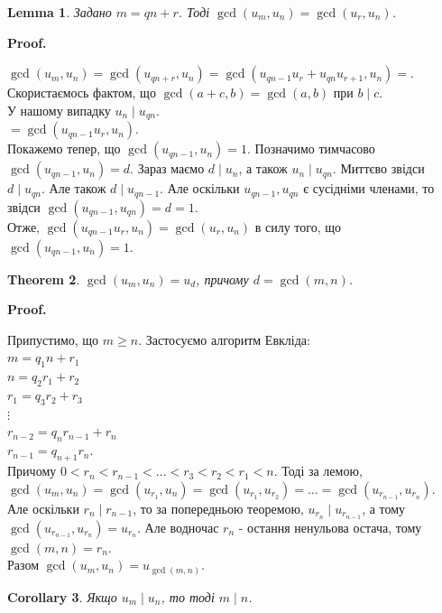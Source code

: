 \documentclass[a4paper, 10pt]{article}
\makeatletter
\theoremstyle{theoremdd}
\newtheorem{theorem}{Theorem}[subsection]
\theoremstyle{theoremdd}
\theoremstyle{theoremdd}
\theoremstyle{theoremdd}
\theoremstyle{theoremdd}
\theoremstyle{theoremdd}
\theoremstyle{theoremdd}
\newtheorem{lemma}[theorem]{Lemma}
\theoremstyle{theoremdd}
\newtheorem{corollary}[theorem]{Corollary}
\renewenvironment{proof}[1][Proof.\\]{\par
\pushQED{\hfill \qed}%
\normalfont \topsep6\p@\@plus6\p@\relax
\trivlist
\item\relax
{\bfseries
#1\@addpunct{.}}\hspace\labelsep\ignorespaces
}{%
\popQED\endtrivlist\@endpefalse
}
\makeatother
\begin{document}
\begin{lemma}
Задано $m = qn + r$. Тоді $\gcd(u_m,u_n) = \gcd(u_r,u_n)$.
\end{lemma}

\begin{proof}
$\gcd(u_m,u_n) = \gcd(u_{qn+r},u_n) = \gcd(u_{qn-1}u_r+u_{qn}u_{r+1},u_n) \boxed{=}$.\\
Скористаємось фактом, що $\gcd(a+c,b) = \gcd(a,b)$ при $b \mid c$.\\
У нашому випадку $u_n \mid u_{qn}$.\\
$\boxed{=} \gcd(u_{qn-1}u_r,u_n)$.\\
Покажемо тепер, що $\gcd(u_{qn-1},u_n) = 1$. Позначимо тимчасово $\gcd(u_{qn-1},u_n) = d$. Зараз маємо $d \mid u_n$, а також $u_n \mid u_{qn}$. Миттєво звідси $d \mid u_{qn}$. Але також $d \mid u_{qn-1}$. Але оскільки $u_{qn-1}, u_{qn}$ є сусідніми членами, то звідси $\gcd(u_{qn-1},u_{qn}) = d = 1$.\\
Отже, $\gcd(u_{qn-1}u_r,u_n) = \gcd(u_r,u_n)$ в силу того, що $\gcd(u_{qn-1},u_n) = 1$. 
\end{proof}

\begin{theorem}
$\gcd(u_m,u_n) = u_d$, причому $d = \gcd(m,n)$.
\end{theorem}

\begin{proof}
Припустимо, що $m \geq n$. Застосуємо алгоритм Евкліда:\\
$m = q_1n + r_1$\\
$n = q_2r_1 + r_2$\\
$r_1 = q_3r_2 + r_3$\\
$\vdots$\\
$r_{n-2} = q_nr_{n-1} +r_n$\\
$r_{n-1} = q_{n+1}r_n$.\\
Причому $0 < r_n < r_{n-1} < \dots < r_3 < r_2 < r_1 < n$. Тоді за лемою,\\
$\gcd(u_m,u_n) = \gcd(u_{r_1},u_n) = \gcd(u_{r_1},u_{r_2}) = \dots = \gcd(u_{r_{n-1}},u_{r_n})$.\\
Але оскільки $r_n \mid r_{n-1}$, то за попередньою теоремою, $u_{r_n} \mid u_{r_{n-1}}$, а тому $\gcd(u_{r_{n-1}},u_{r_n}) = u_{r_n}$. Але водночас $r_n$ - остання ненульова остача, тому $\gcd(m,n) = r_n$.\\
Разом $\gcd(u_m,u_n) = u_{\gcd(m,n)}$.
\end{proof}

\begin{corollary}
Якщо $u_m \mid u_n$, то тоді $m \mid n$.
\end{corollary}
\end{document}
